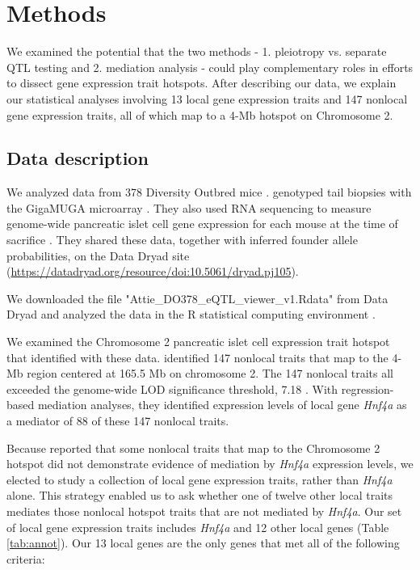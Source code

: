 \documentclass{article}
\begin{document}
\section{Methods}

We examined the potential that the two methods - 1. pleiotropy vs. separate QTL testing and 2. mediation analysis - could play complementary roles in efforts to dissect gene expression trait hotspots. After describing our data, we explain our statistical analyses involving 13 local gene expression traits and 147 nonlocal gene expression traits, all of which map to a 4-Mb hotspot on Chromosome 2.

\subsection{Data description}

We analyzed data from 378 Diversity Outbred mice \citep{keller2018genetic}. \citet{keller2018genetic} genotyped tail biopsies with the GigaMUGA microarray \citep{morgan2015mouse}. They also used RNA sequencing to measure genome-wide pancreatic islet cell gene expression for each mouse at the time of sacrifice \citep{keller2018genetic}. They shared these data, together with inferred founder allele probabilities, on the Data Dryad site (\url{https://datadryad.org/resource/doi:10.5061/dryad.pj105}). 

We downloaded the file "Attie\_DO378\_eQTL\_viewer\_v1.Rdata" from Data Dryad \citep{keller2018genetic} and analyzed the data in the R statistical computing environment \citep{r}.

We examined the Chromosome 2 pancreatic islet cell expression trait hotspot that \citet{keller2018genetic} identified with these data. \citet{keller2018genetic} identified 147 nonlocal traits that map to the 4-Mb region centered at 165.5 Mb on chromosome 2. The 147 nonlocal traits all exceeded the genome-wide LOD significance threshold, 7.18 \citep{keller2018genetic}. With regression-based mediation analyses, they identified expression levels of local gene \emph{Hnf4a} as a mediator of 88 of these 147 nonlocal traits. 

Because \citet{keller2018genetic} reported that some nonlocal traits that map to the Chromosome 2 hotspot did not demonstrate evidence of mediation by \emph{Hnf4a} expression levels, we elected to study a collection of local gene expression traits, rather than \emph{Hnf4a} alone. This strategy enabled us to ask whether one of twelve other local traits mediates those nonlocal hotspot traits that are not mediated by \emph{Hnf4a}. Our set of local gene expression traits includes \emph{Hnf4a} and 12 other local genes (Table \ref{tab:annot}). Our 13 local genes are the only genes that met all of the following criteria:
\end{document}
